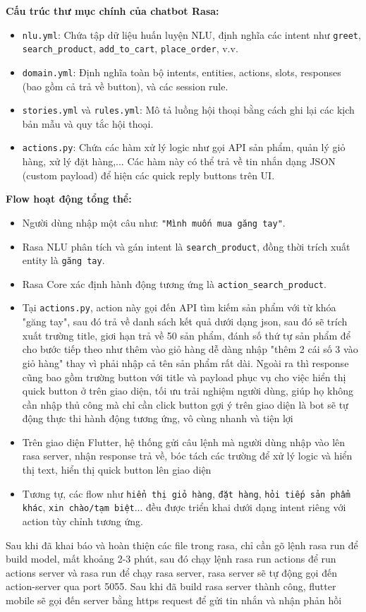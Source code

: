 \documentclass[../DoAn.tex]{subfiles}
\begin{document}
\textbf{Cấu trúc thư mục chính của chatbot Rasa:}
\begin{itemize}
    \item \texttt{nlu.yml}: Chứa tập dữ liệu huấn luyện NLU, định nghĩa các intent như \texttt{greet}, \texttt{search\_product}, \texttt{add\_to\_cart}, \texttt{place\_order}, v.v.
    \item \texttt{domain.yml}: Định nghĩa toàn bộ intents, entities, actions, slots, responses (bao gồm cả trả về button), và các session rule.
    \item \texttt{stories.yml} và \texttt{rules.yml}: Mô tả luồng hội thoại bằng cách ghi lại các kịch bản mẫu và quy tắc hội thoại.
    \item \texttt{actions.py}: Chứa các hàm xử lý logic như gọi API sản phẩm, quản lý giỏ hàng, xử lý đặt hàng,... Các hàm này có thể trả về tin nhắn dạng JSON (custom payload) để hiện các quick reply buttons trên UI.
\end{itemize}

\textbf{Flow hoạt động tổng thể:}

\begin{itemize}

    \item Người dùng nhập một câu như: \texttt{"Mình muốn mua găng tay"}.
    \item Rasa NLU phân tích và gán intent là \texttt{search\_product}, đồng thời trích xuất entity là \texttt{găng tay}.
    \item Rasa Core xác định hành động tương ứng là \texttt{action\_search\_product}.
    \item Tại \texttt{actions.py}, action này gọi đến API tìm kiếm sản phẩm với từ khóa "găng tay", sau đó trả về danh sách kết quả dưới dạng json, sau đó sẽ trích xuất trường title, giơi hạn trả về 50 sản phẩm, đánh số thứ tự sản phẩm để cho bước tiếp theo như thêm vào giỏ hàng dễ dàng nhập "thêm 2 cái số 3 vào giỏ hàng" thay vì phải nhập cả tên sản phẩm rất dài. Ngoài ra thì response cũng bao gồm trường button với title và payload phục vụ cho việc hiển thị quick button ở trên giao diện, tối ưu trải nghiệm người dùng, giúp họ không cần nhập thủ công mà chỉ cần click button gợi ý trên giao diện là bot sẽ tự động thực thi hành động tương ứng, vô cùng nhanh và tiện lợi
    \item Trên giao diện Flutter, hệ thống gửi câu lệnh mà người dùng nhập vào lên rasa server, nhận response trả về, bóc tách các trường để xử lý logic và hiển thị text, hiển thị quick button lên giao diện 
    \item Tương tự, các flow như \texttt{hiển thị giỏ hàng}, \texttt{đặt hàng}, \texttt{hỏi tiếp sản phẩm khác}, \texttt{xin chào/tạm biệt}... đều được triển khai dưới dạng intent riêng với action tùy chỉnh tương ứng.
\end{itemize}
Sau khi đã khai báo và hoàn thiện các file trong rasa, chỉ cần gõ lệnh rasa run để build model, mất khoảng 2-3 phút, sau đó chạy lệnh 
rasa run actions để run actions server và rasa run để chạy rasa server, rasa server sẽ tự động gọi đến action-server qua port 5055. Sau khi đã build rasa server thành công, flutter mobile sẽ gọi đến server bằng https request để gửi tin nhắn và nhận phản hồi
\end{document}
